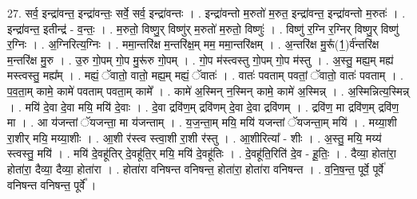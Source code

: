 \documentclass[17pt]{extarticle}
\begin{document}
27. सर्व॒ इन्द्रा॑वन्त॒ इन्द्रा॑वन्तः॒ सर्वे॒ सर्व॒ इन्द्रा॑वन्तः । . इन्द्रा॑वन्तो म॒रुतो॑ म॒रुत॒ इन्द्रा॑वन्त॒ इन्द्रा॑वन्तो म॒रुतः॑ । . इन्द्रा॑वन्त॒ इतीन्द्र॑ - व॒न्तः॒ । . म॒रुतो॒ विष्णु॒र् विष्णु॑र् म॒रुतो॑ म॒रुतो॒ विष्णुः॑ । . विष्णु॑ र॒ग्नि र॒ग्निर् विष्णु॒र् विष्णु॑ र॒ग्निः । . अ॒ग्निरित्य॒ग्निः । . ममा॒न्तरि॑क्ष म॒न्तरि॑क्ष॒म् मम॒ ममा॒न्तरि॑क्षम् । . अ॒न्तरि॑क्ष मु॒रू᳚(1॒)र्व॑न्तरि॑क्ष म॒न्तरि॑क्ष मु॒रु । . उ॒रु गो॒पम् गो॒प मु॒रू॑रु गो॒पम् । . गो॒प म॑स्त्वस्तु गो॒पम् गो॒प म॑स्तु । . अ॒स्तु॒ मह्य॒म् मह्य॑ मस्त्वस्तु॒ मह्य᳚म् । . मह्यं॒ ॅवातो॒ वातो॒ मह्य॒म् मह्यं॒ ॅवातः॑ । . वातः॑ पवताम् पवतां॒ ॅवातो॒ वातः॑ पवताम् । . प॒व॒ता॒म् कामे॒ कामे॑ पवताम् पवता॒म् कामे᳚ । . कामे॑ अ॒स्मिन् न॒स्मिन् कामे॒ कामे॑ अ॒स्मिन्न् । . अ॒स्मिन्नित्य॒स्मिन्न् । . मयि॑ दे॒वा दे॒वा मयि॒ मयि॑ दे॒वाः । . दे॒वा द्रवि॑ण॒म् द्रवि॑णम् दे॒वा दे॒वा द्रवि॑णम् । . द्रवि॑ण॒ मा द्रवि॑ण॒म् द्रवि॑ण॒ मा । . आ य॑जन्तां ॅयजन्ता॒ मा य॑जन्ताम् । . य॒ज॒न्ता॒म् मयि॒ मयि॑ यजन्तां ॅयजन्ता॒म् मयि॑ । . मय्या॒शी रा॒शीर् मयि॒ मय्या॒शीः । . आ॒शी र॑स्त्व स्त्वा॒शी रा॒शी र॑स्तु । . आ॒शीरित्या᳚ - शीः । . अ॒स्तु॒ मयि॒ मय्य॑ स्त्वस्तु॒ मयि॑ । . मयि॑ दे॒वहू॑तिर् दे॒वहू॑ति॒र् मयि॒ मयि॑ दे॒वहू॑तिः । . दे॒वहू॑ति॒रिति॑ दे॒व - हू॒तिः॒ । . दैव्या॒ होता॑रा॒ होता॑रा॒ दैव्या॒ दैव्या॒ होता॑रा । . होता॑रा वनिषन्त वनिषन्त॒ होता॑रा॒ होता॑रा वनिषन्त । . व॒नि॒ष॒न्त॒ पूर्वे॒ पूर्वे॑ वनिषन्त वनिषन्त॒ पूर्वे᳚ । \newline
\end{document}
